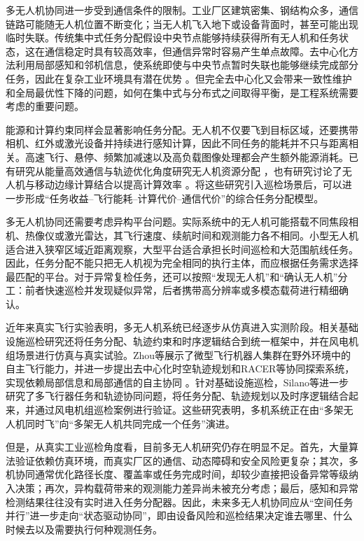 多无人机协同进一步受到通信条件的限制。工业厂区建筑密集、钢结构众多，通信链路可能随无人机位置不断变化；当无人机飞入地下或设备背面时，甚至可能出现临时失联。传统集中式任务分配假设中央节点能够持续获得所有无人机和任务状态，这在通信稳定时具有较高效率，但通信异常时容易产生单点故障。去中心化方法利用局部感知和邻机信息，使系统即使与中央节点暂时失联也能够继续完成部分任务，因此在复杂工业环境具有潜在优势
\cite{zeng2016wireless,mozaffari2019tutorial}。但完全去中心化又会带来一致性维护和全局最优性下降的问题，如何在集中式与分布式之间取得平衡，是工程系统需要考虑的重要问题。

能源和计算约束同样会显著影响任务分配。无人机不仅要飞到目标区域，还要携带相机、红外或激光设备并持续进行感知计算，因此不同任务的能耗并不只与距离相关。高速飞行、悬停、频繁加减速以及高负载图像处理都会产生额外能源消耗。已有研究从能量高效通信与轨迹优化角度研究无人机资源分配
\cite{zhang2019energy}，也有研究讨论了无人机与移动边缘计算结合以提高计算效率
\cite{zhou2018computation}。将这些研究引入巡检场景后，可以进一步形成“任务收益--飞行能耗--计算代价--通信代价”的综合任务分配模型。

多无人机协同还需要考虑异构平台问题。实际系统中的无人机可能搭载不同焦段相机、热像仪或激光雷达，其飞行速度、续航时间和观测能力各不相同。小型无人机适合进入狭窄区域近距离观察，大型平台适合承担长时间巡检和大范围航线任务。因此，任务分配不能只把无人机视为完全相同的执行主体，而应根据任务需求选择最匹配的平台。对于异常复检任务，还可以按照“发现无人机”和“确认无人机”分工：前者快速巡检并发现疑似异常，后者携带高分辨率或多模态载荷进行精细确认。

近年来真实飞行实验表明，多无人机系统已经逐步从仿真进入实测阶段。相关基础设施巡检研究还将任务分配、轨迹约束和时序逻辑结合到统一框架中，并在风电机组场景进行仿真与真实试验\cite{silano2024stl}。Zhou等展示了微型飞行机器人集群在野外环境中的自主飞行能力，并进一步提出去中心化时空轨迹规划和RACER等协同探索系统，实现依赖局部信息和局部通信的自主协同
\cite{zhou2021decentralized,zhou2022swarm,zhou2023racer}。针对基础设施巡检，Silano等进一步研究了多飞行器任务和轨迹协同问题，将任务分配、轨迹规划以及时序逻辑结合起来，并通过风电机组巡检案例进行验证。这些研究表明，多机系统正在由“多架无人机同时飞”向“多架无人机共同完成一个任务”演进。

但是，从真实工业巡检角度看，目前多无人机研究仍存在明显不足。首先，大量算法验证依赖仿真环境，而真实厂区的通信、动态障碍和安全风险更复杂；其次，多机协同通常优化路径长度、覆盖率或任务完成时间，却较少直接把设备异常等级纳入决策；再次，异构载荷带来的观测能力差异尚未被充分考虑；最后，感知和异常检测结果往往没有实时进入任务分配器。因此，未来多无人机协同应从“空间任务并行”进一步走向“状态驱动协同”，即由设备风险和巡检结果决定谁去哪里、什么时候去以及需要执行何种观测任务。

